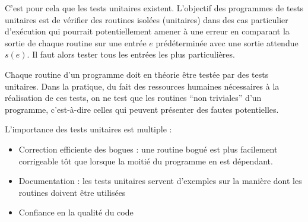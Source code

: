 \documentclass[../../../main.tex]{subfiles}
\begin{document}
C'est pour cela que les tests unitaires existent. L'objectif des programmes de tests unitaires est de
vérifier des routines isolées (unitaires) dans des cas particulier d'exécution qui pourrait potentiellement
amener à une erreur en comparant la sortie de chaque routine sur une entrée $e$ prédéterminée avec une
sortie attendue $s(e)$. Il faut alors tester tous les entrées les plus particulières.

Chaque routine d'un programme doit en théorie être testée par des tests unitaires. Dans la pratique,
du fait des ressources humaines nécessaires à la réalisation de ces tests, on ne test que les routines
``non triviales'' d'un programme, c'est-à-dire celles qui peuvent présenter des fautes potentielles.

L'importance des tests unitaires est multiple :
\begin{itemize}
	\item Correction efficiente des bogues : une routine bogué est plus facilement corrigeable tôt que lorsque
la moitié du programme en est dépendant.
	\item Documentation : les tests unitaires servent d'exemples sur la manière dont les routines doivent
être utilisées
	\item Confiance en la qualité du code
\end{itemize}
\end{document}
